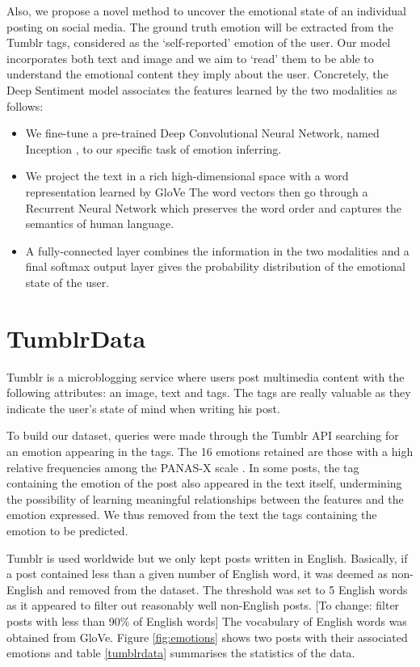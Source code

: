 \documentclass{article} %
\begin{document}
Also, we propose a novel method to uncover the emotional state of an individual posting on social media. The ground truth emotion will be extracted from the Tumblr tags, considered as the `self-reported' emotion of the user. Our model incorporates both text and image and we aim to `read' them to be able to understand the emotional content they imply about the user. Concretely, the Deep Sentiment model associates the features learned by the two modalities as follows:

\begin{itemize}
    \item We fine-tune a pre-trained Deep Convolutional Neural Network, named Inception \citep{Szegedy-15}, to our specific task of emotion inferring.
    \item We project the text in a rich high-dimensional space with a word representation learned by GloVe \citep{Pennington-14} The word vectors then go through a Recurrent Neural Network which preserves the word order and captures the semantics of human language.
    \item A fully-connected layer combines the information in the two modalities and a final softmax output layer gives the probability distribution of the emotional state of the user.
\end{itemize}


\section{TumblrData}

Tumblr is a microblogging service where users post multimedia content with the following attributes: an image, text and tags. The tags are really valuable as they indicate the user's state of mind when writing his post. 

To build our dataset, queries were made through the Tumblr API searching for an emotion appearing in the tags. The 16 emotions retained are those with a high relative frequencies among the PANAS-X scale \citep{PANAS-X}. In some posts, the tag containing the emotion of the post also appeared in the text itself, undermining the possibility of learning meaningful relationships between the features and the emotion expressed. We thus removed from the text the tags containing the emotion to be predicted.

Tumblr is used worldwide but we only kept posts written in English. Basically, if a post contained less than a given number of English word, it was deemed as non-English and removed from the dataset. The threshold was set to 5 English words as it appeared to filter out reasonably well non-English posts. [To change: filter posts with less than 90\% of English words] The vocabulary of English words was obtained from GloVe. Figure \ref{fig:emotions} shows two posts with their associated emotions and table \ref{tumblrdata} summarises the statistics of the data.
\end{document}
